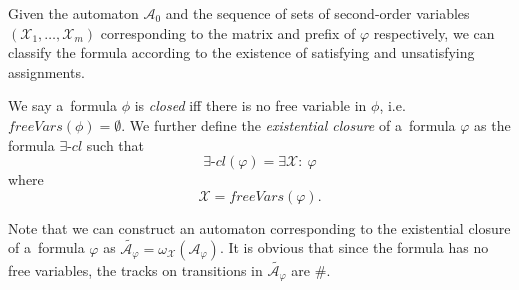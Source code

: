 % 

Given the automaton $\mathcal{A}_0$ and the sequence of sets of second-order
variables $(\mathcal{X}_1,\ldots,\mathcal{X}_m)$ corresponding to the matrix
and prefix of $\varphi$ respectively, we can classify the formula according to
the existence of satisfying and unsatisfying assignments.

\begin{defz}
We say a~formula $\phi$ is \emph{closed} iff there is no free variable in
$\phi$, i.e.
$\mathit{freeVars}(\phi) = \emptyset$.
We further define the \emph{existential closure} of a~formula $\varphi$ as
the formula $\exists\mbox{-}\mathit{cl}$ such that
\begin{equation}
 \exists\mbox{-}\mathit{cl}(\varphi) = \exists\mathcal{X}:\ \varphi
\end{equation}
where
\begin{equation}
 \mathcal{X} = \mathit{freeVars}(\varphi).
\end{equation}

Note that we can construct an automaton corresponding to the existential closure
of a~formula $\varphi$ as $\widetilde{\mathcal{A_\varphi}} =
\omega_\mathcal{X}(\mathcal{A}_\varphi)$.
It is obvious that since the formula has no free variables, the tracks on transitions
in $\widetilde{\mathcal{A}_\varphi}$ are $\#$.
\end{defz}

